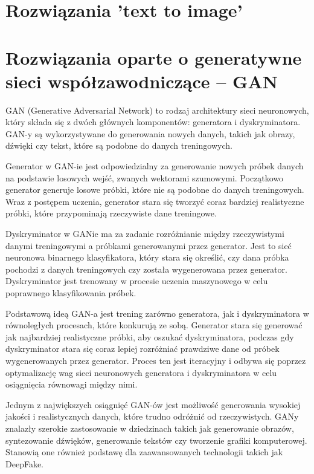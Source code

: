 \usepackage{wrapfig}

\section{Rozwiązania 'text to image'}


\section{Rozwiązania oparte o generatywne sieci współzawodniczące -- GAN}


GAN (Generative Adversarial Network) to rodzaj architektury sieci neuronowych, który składa się z dwóch głównych komponentów: generatora i dyskryminatora.
GAN-y są wykorzystywane do generowania nowych danych, takich jak obrazy, dźwięki czy tekst, które są podobne do danych treningowych.

Generator w GAN-ie jest odpowiedzialny za generowanie nowych próbek danych na podstawie losowych wejść, zwanych wektorami szumowymi.
    Początkowo generator generuje losowe próbki, które nie są podobne do danych treningowych.
    Wraz z postępem uczenia, generator stara się tworzyć coraz bardziej realistyczne próbki, które przypominają rzeczywiste dane treningowe.

Dyskryminator w GANie ma za zadanie rozróżnianie między rzeczywistymi danymi treningowymi a próbkami generowanymi przez generator.
Jest to sieć neuronowa binarnego klasyfikatora, który stara się określić, czy dana próbka pochodzi z danych treningowych czy została wygenerowana przez generator.
Dyskryminator jest trenowany w procesie uczenia maszynowego w celu poprawnego klasyfikowania próbek.

Podstawową ideą GAN-a jest trening zarówno generatora, jak i dyskryminatora w równoległych procesach, które konkurują ze sobą.
Generator stara się generować jak najbardziej realistyczne próbki, aby oszukać dyskryminatora, podczas gdy dyskryminator stara się coraz lepiej rozróżniać prawdziwe dane od próbek wygenerowanych przez generator.
Proces ten jest iteracyjny i odbywa się poprzez optymalizację wag sieci neuronowych generatora i dyskryminatora w celu osiągnięcia równowagi między nimi.

Jednym z największych osiągnięć GAN-ów jest możliwość generowania wysokiej jakości i realistycznych danych, które trudno odróżnić od rzeczywistych.
GANy znalazły szerokie zastosowanie w dziedzinach takich jak generowanie obrazów, syntezowanie dźwięków, generowanie tekstów czy tworzenie grafiki komputerowej.
Stanowią one również podstawę dla zaawansowanych technologii takich jak DeepFake.

